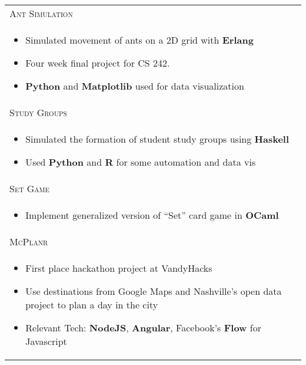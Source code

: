 \documentclass[letterpaper,10pt]{article}
\begin{document}
\begin{tabular}{p{15.8cm}}
    \textsc{Ant Simulation} \\

    \vspace{-2mm}
    \begin{itemize}
        \item
            Simulated movement of ants on a 2D grid with \textbf{Erlang}
        \item
            Four week final project for CS 242.
        \item
            \textbf{Python} and \textbf{Matplotlib} used for data visualization
    \end{itemize} \\

    \textsc{Study Groups} \\
    \vspace{-2mm}
    \begin{itemize}
        \item
            Simulated the formation of student study groups using
            \textbf{Haskell}
        \item
            Used \textbf{Python} and \textbf{R} for some automation and data vis
    \end{itemize} \\

    \textsc{Set Game} \\
    \vspace{-2mm}
    \begin{itemize}
        \item
            Implement generalized version of  ``Set'' card game in \textbf{OCaml}
    \end{itemize} \\

    \textsc{McPlanr} \\
    \vspace{-2mm}
    \begin{itemize}
        \item
            First place hackathon project at VandyHacks
        \item
            Use destinations from Google Maps and Nashville's open data project
            to plan a day in the city
        \item
            Relevant Tech: \textbf{NodeJS}, \textbf{Angular}, Facebook's
            \textbf{Flow} for Javascript
    \end{itemize} \\

\end{tabular}
\end{document}

